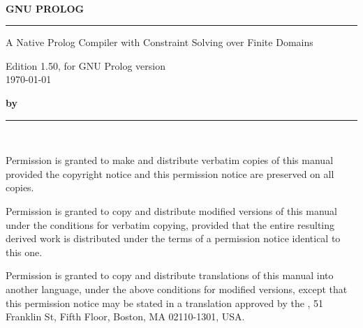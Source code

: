 \pagestyle{empty}
\setlength{\parskip}{0pt}
~

\vspace{4cm}
{\huge\bf GNU PROLOG}
\vspace{3mm}

\rule[2mm]{\linewidth}{2mm}

\begin{flushright}
{\Large
A Native Prolog Compiler with Constraint Solving over Finite Domains

Edition 1.50, for GNU Prolog version \\
\today
}
\end{flushright}
\vspace{5cm}
\vspace{5cm}

{\Large\bf by }

\rule[2mm]{\linewidth}{1mm}



\newpage
~

\vspace{17cm}

\setlength{\parskip}{\saveparskip}



Permission is granted to make and distribute verbatim copies of this manual
provided the copyright notice and this permission notice are preserved on all
copies.

Permission is granted to copy and distribute modified versions of this manual
under the conditions for verbatim copying, provided that the entire resulting
derived work is distributed under the terms of a permission notice identical
to this one.

Permission is granted to copy and distribute translations of this manual into
another language, under the above conditions for modified versions, except
that this permission notice may be stated in a translation approved by the
, 51 Franklin St, Fifth Floor, Boston, MA  02110-1301, USA.


\newpage
\pagestyle{fancy}
\setcounter{page}{1}

